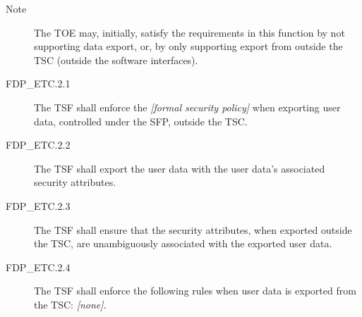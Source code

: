 \documentclass[12pt,english]{scrbook}
\begin{document}



\begin{description}
\item[Note]

The TOE may, initially, satisfy the requirements in this
function by not supporting data export, or, by only
supporting export from outside the TSC (outside the
software interfaces).

\item[FDP{\_}ETC.2.1]

The TSF shall enforce the \emph{{[}formal security policy]} when exporting user
data, controlled under the SFP, outside the TSC.

\item[FDP{\_}ETC.2.2]

The TSF shall export the user data with the user data's associated 
security attributes.

\item[FDP{\_}ETC.2.3]

The TSF shall ensure that the security attributes, when 
exported outside the TSC, are unambiguously associated 
with the exported user data.

\item[FDP{\_}ETC.2.4]

The TSF shall enforce the following rules when user data 
is exported from the TSC: \emph{{[}none]}.

\end{description}


\end{document}

